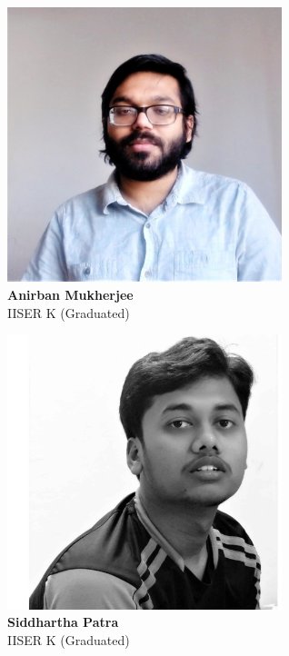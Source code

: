 \documentclass[10pt,aspectratio=169]{beamer}
\begin{document}
\begin{frame}{}
\begin{minipage}{0.25\textwidth}
	\centering
	\includegraphics[width=0.6\textwidth]{amukherjee.jpg}\\
	\footnotesize{{\bf Anirban Mukherjee}\\
	IISER K (Graduated)}
\end{minipage}
\begin{minipage}{0.25\textwidth}
	\centering
	\includegraphics[width=0.6\textwidth]{spatra.jpg}\\
	\footnotesize{{\bf Siddhartha Patra}\\
	IISER K (Graduated)}
\end{minipage}
\begin{minipage}{0.1\textwidth}

\end{minipage}
\end{frame}
\end{document}
